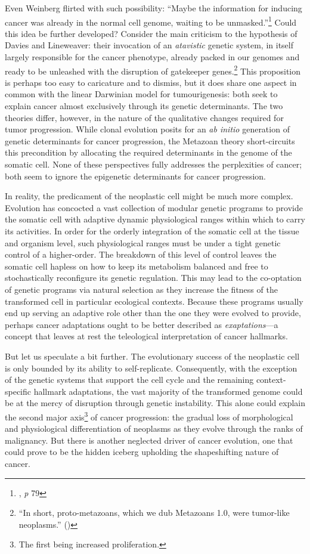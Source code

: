 Even Weinberg flirted with such possibility: ``Maybe the information for
inducing cancer was already in the normal cell genome, waiting to be
unmasked.''\footnote{\citealp{weinberg_biology_2013}, \emph{p} 79} Could this
idea be further developed?  Consider the main criticism to the hypothesis of
Davies and Lineweaver: their invocation of an \emph{atavistic} genetic system,
in itself largely responsible for the cancer phenotype, already packed in our
genomes and ready to be unleashed with the disruption of gatekeeper
genes.\footnote{``In short, proto-metazoans, which we dub Metazoans 1.0, were
  tumor-like neoplasms.'' (\citealp{davies_cancer_2011})} This proposition is
perhaps too easy to caricature and to dismiss, but it does share one aspect in
common with the linear Darwinian model for tumourigenesis: both seek to explain
cancer almost exclusively through its genetic determinants.  The two theories
differ, however, in the nature of the qualitative changes required for tumor
progression.  While clonal evolution posits for an \emph{ab initio} generation
of genetic determinants for cancer progression, the Metazoan theory
short-circuits this precondition by allocating the required determinants in the
genome of the somatic cell.  None of these perspectives fully addresses the
perplexities of cancer; both seem to ignore the epigenetic determinants for
cancer progression.

In reality, the predicament of the neoplastic cell might be much more complex.
Evolution has concocted a vast collection of modular genetic programs to provide
the somatic cell with adaptive dynamic physiological ranges within which to
carry its activities.  In order for the orderly integration of the somatic cell
at the tissue and organism level, such physiological ranges must be under a
tight genetic control of a higher-order.  The breakdown of this level of control
leaves the somatic cell hapless on how to keep its metabolism balanced and free
to stochastically reconfigure its genetic regulation.  This may lead to the
co-optation of genetic programs via natural selection as they increase the
fitness of the transformed cell in particular ecological contexts.  Because
these programs usually end up serving an adaptive role other than the one they
were evolved to provide, perhaps cancer adaptations ought to be better described
as \emph{exaptations}\cite{gould_exaptation_1982}---a concept that leaves at
rest the teleological interpretation of cancer hallmarks.

But let us speculate a bit further.  The evolutionary success of the neoplastic
cell is only bounded by its ability to self-replicate.  Consequently, with the
exception of the genetic systems that support the cell cycle and the remaining
context-specific hallmark adaptations, the vast majority of the transformed
genome could be at the mercy of disruption through genetic instability.  This
alone could explain the second major axis\footnote{The first being increased
  proliferation.} of cancer progression: the gradual loss of morphological and
physiological differentiation of neoplasms as they evolve through the ranks of
malignancy.  But there is another neglected driver of cancer evolution, one that
could prove to be the hidden iceberg upholding the shapeshifting nature of
cancer.

